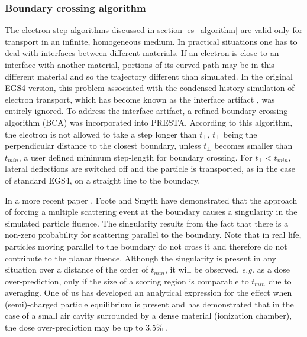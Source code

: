 \subsubsection{Boundary crossing algorithm}
\label{BCA}
\setcounter{equation}{0}

The electron-step algorithms discussed in section
\ref{es_algorithm} are valid only for transport in
an infinite, homogeneous medium. In practical
situations one has to deal with interfaces between
different materials. If an electron is close
to an interface with another material, portions
of its curved path may be in this different material and
so the trajectory different than simulated.
In the original EGS4 version, this problem associated
with the condensed history simulation of electron
transport, which has become known as the interface artifact \cite{Bi85}, was
entirely ignored.
To address the interface artifact,
a refined boundary crossing algorithm (BCA) was
incorporated into PRESTA. According to this algorithm, the electron
is not allowed to take a step longer than $t_\perp$, $t_\perp$ being
the perpendicular distance to the closest boundary, unless
$t_\perp$ becomes smaller than $t_{min}$, a user defined
minimum step-length for boundary crossing. For $t_\perp < t_{min}$,
lateral deflections are switched off and the particle is transported,
as in the case of standard EGS4, on a straight line to the
boundary.

In a more recent paper \cite{FS95}, Foote and Smyth have demonstrated
that the approach of forcing a multiple scattering event at the
boundary causes a singularity in the simulated particle fluence.
The singularity results from the fact that there is a
non-zero probability for scattering parallel to the boundary.
Note that in real life, particles moving parallel to the boundary do
not cross it and therefore do not contribute to the planar fluence.
Although the singularity is present in any situation over a distance of the
order of $t_{min}$, it will be observed, {\em e.g.} as a dose
over-prediction, only if the
size of a scoring region is comparable to $t_{min}$ due to averaging.
One of us has developed an analytical expression for
the effect when (semi)-charged particle equilibrium is
present and has demonstrated that in the case of a small air
cavity surrounded by a dense material (ionization chamber),
the dose over-prediction may be up to 3.5\% \cite{Ka99b}.

